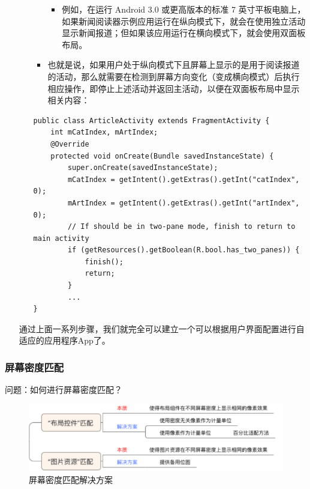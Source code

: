 \documentclass[9pt, b5paper]{article}
\begin{document}
\begin{enumerate}
\begin{itemize}
\begin{itemize}
\begin{itemize}
\item 例如，在运行 Android 3.0 或更高版本的标准 7 英寸平板电脑上，如果新闻阅读器示例应用运行在纵向模式下，就会在使用独立活动显示新闻报道；但如果该应用运行在横向模式下，就会使用双面板布局。
\end{itemize}
\item 也就是说，如果用户处于纵向模式下且屏幕上显示的是用于阅读报道的活动，那么就需要在检测到屏幕方向变化（变成横向模式）后执行相应操作，即停止上述活动并返回主活动，以便在双面板布局中显示相关内容：
\end{itemize}
\begin{verbatim}
public class ArticleActivity extends FragmentActivity {
    int mCatIndex, mArtIndex;
    @Override
    protected void onCreate(Bundle savedInstanceState) {
        super.onCreate(savedInstanceState);
        mCatIndex = getIntent().getExtras().getInt("catIndex", 0);
        mArtIndex = getIntent().getExtras().getInt("artIndex", 0);
        // If should be in two-pane mode, finish to return to main activity
        if (getResources().getBoolean(R.bool.has_two_panes)) {
            finish();
            return;
        }
        ...
}
\end{verbatim}
\end{itemize}

通过上面一系列步骤，我们就完全可以建立一个可以根据用户界面配置进行自适应的应用程序App了。
\end{enumerate}

\subsubsection{屏幕密度匹配}
\label{sec-1-6-2}

问题：如何进行屏幕密度匹配？

\begin{figure}[htb]
\centering
\includegraphics[width=.9\linewidth]{./pic/density.png}
\caption{屏幕密度匹配解决方案}
\end{figure}
\end{document}
